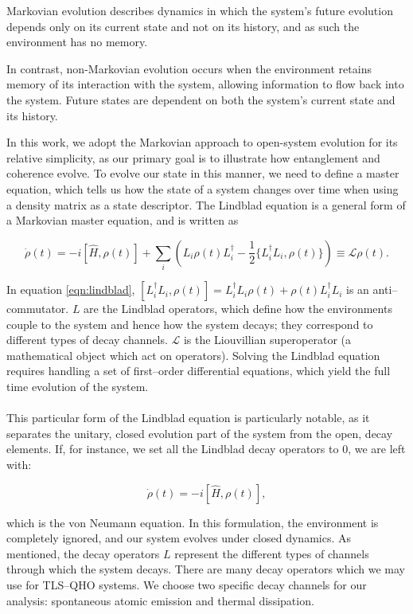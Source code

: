 \documentclass[12pt]{article}
\begin{document}
Markovian evolution describes dynamics in which the system's future evolution depends only on its current state and not on its history, and as such the environment has no memory. 

In contrast, non-Markovian evolution occurs when the environment retains memory of its interaction with the system, allowing information to flow back into the system. Future states are dependent on both the system's current state and its history. 

In this work, we adopt the Markovian approach to open-system evolution for its relative simplicity, as our primary goal is to illustrate how entanglement and coherence evolve. To evolve our state in this manner, we need to define a master equation, which tells us how the state of a system changes over time when using a density matrix as a state descriptor. The Lindblad equation is a general form of a Markovian master equation, and is written as 

\begin{equation} \label{eqn:lindblad}
    \dot \rho(t) = - i[\hat{H}, \rho(t)] + \sum_i\left(L_i\rho(t)L_i^\dagger - \frac{1}{2}\{L_i^\dagger L_i,\rho(t)\} \right) \equiv \mathcal{L}\rho(t).
\end{equation} 

In equation \ref{eqn:lindblad}, $[L_i^\dagger L_i, \rho (t)] = L_i^\dagger L_i\rho(t) + \rho(t)L_i^\dagger L_i$ is an anti--commutator. $L$ are the Lindblad operators, which define how the environments couple to the system and hence how the system decays; they correspond to different types of decay channels. $\mathcal{L}$ is the Liouvillian superoperator (a mathematical object which act on operators). Solving the Lindblad equation requires handling a set of first--order differential equations, which yield the full time evolution of the system. \\
\\
This particular form of the Lindblad equation is particularly notable, as it separates the unitary, closed evolution part of the system from the open, decay elements. If, for instance, we set all the Lindblad decay operators to 0, we are left with:

\begin{equation}
    \dot \rho(t) = - i[\hat{H}, \rho(t)],
\end{equation}

which is the von Neumann equation. In this formulation, the environment is completely ignored, and our system evolves under closed dynamics. As mentioned, the decay operators $L$ represent the different types of channels through which the system decays. There are many decay operators which we may use for TLS--QHO systems. We choose two specific decay channels for our analysis: spontaneous atomic emission and thermal dissipation. 
\end{document}
